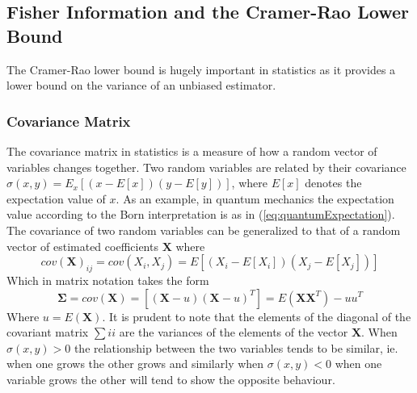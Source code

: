 \subsection{Fisher Information and the Cramer-Rao Lower Bound}
The Cramer-Rao lower bound is hugely important in statistics as it provides a lower bound on the variance of an unbiased estimator.
\subsubsection{Covariance Matrix}
The covariance matrix in statistics is a measure of how a random vector of variables changes together. Two random variables are related by their covariance $\sigma(x,y) = E_x \left[(x-E[x])(y-E[y])\right]$, where $E[x]$ denotes the expectation value of $x$. As an example, in quantum mechanics the expectation value according to the Born interpretation is as in (\ref{eq:quantumExpectation}). The covariance of two random variables can be generalized to that of a random vector of estimated coefficients $\mathbf{X}$ where \cite{covariance}
\begin{equation}
cov(\mathbf{X})_{ij} = cov(X_i,X_j) = E[(X_i-E[X_i])(X_j-E[X_j])]
\end{equation}
Which in matrix notation takes the form 
\begin{equation}
\mathbf{\Sigma} = cov(\mathbf{X}) = [(\mathbf{X}- u)(\mathbf{X}-u)^T] = E(\mathbf{X}\mathbf{X}^T) - uu^T
\label{eq:covarianceMatrix}
\end{equation}
Where $u=E(\mathbf{X})$. It is prudent to note that the elements of the diagonal of the covariant matrix $\sum{ii}$ are the variances of the elements of the vector $\mathbf{X}$. When $\sigma(x,y)>0$ the relationship between the two variables tends to be similar, ie. when one grows the other grows and similarly when $\sigma(x,y)<0$ when one variable grows the other will tend to show the opposite behaviour.\cite{covariance}  

